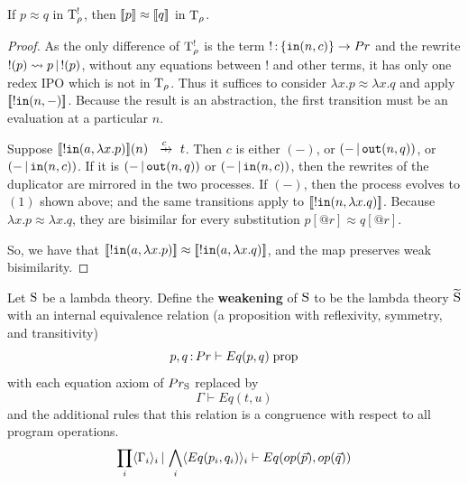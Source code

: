 \documentclass{article}
\begin{document}
\begin{theorem}
    If $p\approx q$ in $\mathrm{T}_\rho^!$, then $[\![p]\!]\approx [\![q]\!]$ in $\mathrm{T}_\rho$.
\end{theorem}
\begin{proof}
    As the only difference of $\mathrm{T}_\rho^!$ is the term $!\,{:}\, \{\mathtt{in}(n,c)\}\to Pr$ and the rewrite $!(p)\rightsquigarrow p\,|\, !(p)$, without any equations between $!$ and other terms, it has only one redex IPO which is not in $\mathrm{T}_\rho$.
    Thus it suffices to consider $\lambda x.p\approx \lambda x.q$ and apply $[\![!\mathtt{in}(n,-)]\!]$. Because the result is an abstraction, the first transition must be an evaluation at a particular $n$.
    
    Suppose $\map{!\mtt{in}(a,\lambda x.p)}(n)\xr{c} t$. Then $c$ is either $(-)$, or $(-\,|\, \mathtt{out}(n,q))$, or $(-\,|\, \mathtt{in}(n,c))$.  If it is $(-\,|\, \mathtt{out}(n,q))$ or $(-\,|\, \mathtt{in}(n,c))$, then the rewrites of the duplicator are mirrored in the two processes.
    If $(-)$, then the process evolves to $(1)$ shown above; and the same transitions apply to $[\![!\mathtt{in}(n,\lambda x. q)]\!]$. Because $\lambda x.p\approx \lambda x.q$, they are bisimilar for every substitution $p[@r]\approx q[@r]$. 
    
    So, we have that $[\![!\mathtt{in}(a,\lambda x.p)]\!]\approx [\![!\mathtt{in}(a,\lambda x.q)]\!]$, and the map preserves weak bisimilarity.
\end{proof}

\newpage


\begin{definition}
    Let $\mathrm{S}$ be a lambda theory. Define the \textbf{weakening} of $\mathrm{S}$ to be the lambda theory $\widetilde{\mathrm{S}}$ with an internal equivalence relation (a proposition with reflexivity, symmetry, and transitivity)
    \[p,q\,{:}\, Pr\vdash Eq(p,q)\; \mathrm{prop}\]
    with each equation axiom of $Pr_{\mathrm{S}}$ replaced by
    \[\Gamma\vdash Eq(t,u)\]
    and the additional rules that this relation is a congruence with respect to all program operations.
    \[\prod_i \langle \Gamma_i\rangle_i\,|\, \bigwedge_i \langle Eq(p_i,q_i)\rangle_i\vdash Eq(op(\vec{p}),op(\vec{q}))\]
\end{definition}
\end{document}
